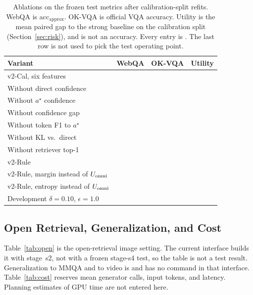 \begin{table}[t]
\caption{Ablations on the frozen test metrics after calibration-split refits.
WebQA is acc$_{\mathrm{approx}}$.
OK-VQA is official VQA accuracy.
Utility is the mean paired gap to the strong baseline on the calibration split (Section~\ref{sec:risk}), and is not an accuracy.
Every entry is \ph{}.
The last row is not used to pick the test operating point.}
\label{tab:ablation}
\scriptsize
\setlength{\tabcolsep}{3pt}
\begin{tabular}{@{}lccc@{}}
\toprule
Variant & WebQA & OK-VQA & Utility \\
\midrule
v2-Cal, six features & \ph{} & \ph{} & \ph{} \\
Without direct confidence & \ph{} & \ph{} & \ph{} \\
Without $a^{\star}$ confidence & \ph{} & \ph{} & \ph{} \\
Without confidence gap & \ph{} & \ph{} & \ph{} \\
Without token F1 to $a^{\star}$ & \ph{} & \ph{} & \ph{} \\
Without KL vs.\ direct & \ph{} & \ph{} & \ph{} \\
Without retriever top-1 & \ph{} & \ph{} & \ph{} \\
v2-Rule & \ph{} & \ph{} & \ph{} \\
v2-Rule, margin instead of $U_{\mathrm{omni}}$ & \ph{} & \ph{} & \ph{} \\
v2-Rule, entropy instead of $U_{\mathrm{omni}}$ & \ph{} & \ph{} & \ph{} \\
Development $\delta=0.10$, $\epsilon=1.0$ & \ph{} & \ph{} & \ph{} \\
\bottomrule
\end{tabular}
\end{table}

\subsection{Open Retrieval, Generalization, and Cost}
\label{sec:extra}
Table~\ref{tab:open} is the open-retrieval image setting.
The current interface builds it with stage~s2, not with a frozen stage-s4 test, so the table is not a test result.
Generalization to MMQA and to video is \ph{} and has no command in that interface.
Table~\ref{tab:cost} reserves mean generator calls, input tokens, and latency.
Planning estimates of GPU time are not entered here.

